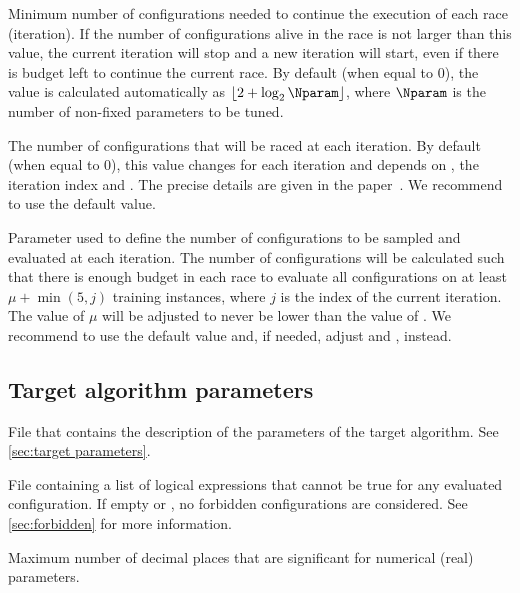 \begin{description}
Minimum number of configurations needed to continue the execution of each race (iteration). If the number of configurations alive in the race is not larger than this value, the current iteration will stop and a new iteration will start, even if there is budget left to continue the current race. By default (when equal to 0), the value is calculated automatically as $\lfloor 2 + \log_{2}\Nparam \rfloor$, where $\Nparam$ is the number of non-fixed parameters to be tuned.

  The number of configurations that will be raced at each iteration. By default (when equal to 0), this value changes for each iteration and depends on , the iteration index and . The precise details are given in the \irace paper~\citep{LopDubPerStuBir2016irace}.
We recommend to use the default value.

  Parameter used to define the number of configurations to be sampled and evaluated at each iteration. The number of configurations will be calculated such that there is enough budget in each race to evaluate all configurations on at least $\mu + \min(5,j)$ training instances, where $j$ is the index of the current iteration. The value of $\mu$ will be adjusted to never be lower than the value of . We recommend to use the default value and, if needed, adjust and , instead.

\end{description}

\subsection[Target algorithm parameters]{Target algorithm parameters}
\begin{description}
File that contains the description of the parameters of the target algorithm. See \autoref{sec:target parameters}.

File containing a list of logical expressions that cannot be true for any evaluated configuration. If empty or , no forbidden configurations are considered. See \autoref{sec:forbidden} for more information.

Maximum number of decimal places that are significant for numerical (real) parameters.

\end{description}

